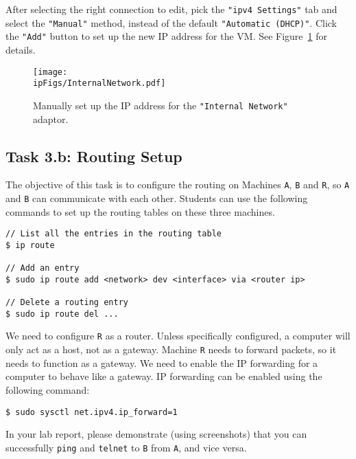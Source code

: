 After selecting the right connection to edit,
pick the \texttt{"ipv4 Settings"} tab and select the
\texttt{"Manual"} method, instead of the default \texttt{"Automatic (DHCP)"}. Click
the \texttt{"Add"} button to set up the new IP address for the VM. See
Figure~\ref{ip:fig:internalnetwork} for details.


\begin{figure}[htb]
\begin{center}
\texttt{[image: \\ipFigs/InternalNetwork.pdf]}
\end{center}
\caption{Manually set up the IP address for the \texttt{"Internal Network"} adaptor.}
\label{ip:fig:internalnetwork}
\end{figure}




\subsection{Task 3.b: Routing Setup} 

The objective of this task is to configure the routing on Machines \texttt{A},
\texttt{B} and \texttt{R}, so \texttt{A} and \texttt{B} can communicate with 
each other. Students can use the following commands to 
set up the routing tables on these three machines. 


\begin{lstlisting}
// List all the entries in the routing table 
$ ip route 

// Add an entry 
$ sudo ip route add <network> dev <interface> via <router ip>

// Delete a routing entry
$ sudo ip route del ...
\end{lstlisting}


We need to configure \texttt{R} as a router.
Unless specifically configured, a computer will only act as a host,
not as a gateway. Machine \texttt{R} needs to forward packets, 
so it needs to function as a gateway. We need to
enable the IP forwarding for a computer to behave like a gateway.
IP forwarding can be enabled using the following command:

\begin{lstlisting}
$ sudo sysctl net.ipv4.ip_forward=1
\end{lstlisting}


In your lab report, please demonstrate (using screenshots) that you can successfully
\texttt{ping} and \texttt{telnet} to \texttt{B} from \texttt{A}, and 
vice versa. 
 


